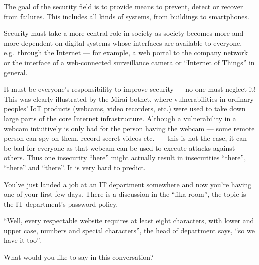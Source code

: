 \begin{solution}
The goal of the security field is to provide means to prevent, detect or recover 
from failures.
This includes all kinds of systems, from buildings to smartphones.

Security must take a more central role in society as society becomes more and 
more dependent on digital systems whose interfaces are available to everyone, 
e.g.\ through the Internet --- for example, a web portal to the company network 
or the interface of a web-connected surveillance camera or \enquote{Internet of 
Things} in general.

It must be everyone's responsibility to improve security --- no one must neglect 
it!
This was clearly illustrated by the Mirai botnet, where vulnerabilities in 
ordinary peoples' IoT products (webcams, video recorders, etc.) were used to 
take down large parts of the core Internet infrastructure.
Although a vulnerability in a webcam intuitively is only bad for the person 
having the webcam --- some remote person can spy on them, record secret videos 
etc.\ --- this is not the case, it can be bad for everyone as that webcam can be 
used to execute attacks against others.
Thus one insecurity \enquote{here} might actually result in insecurities 
\enquote{there}, \enquote{there} and \enquote{there}.
It is very hard to predict.
\end{solution}
 
\question[3]
You've just landed a job at an IT department somewhere and now you're having one 
of your first few days.
There is a discussion in the \enquote{fika room}, the topic is the IT 
department's password policy.

\enquote{Well, every respectable website requires at least eight characters, 
with lower and upper case, numbers and special characters}, the head of 
department says, \enquote{so we have it too}.

What would you like to say in this conversation?

